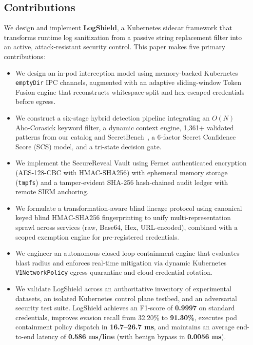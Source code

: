 \documentclass[conference]{IEEEtran}
\begin{document}
\subsection{Contributions}
We design and implement \textbf{LogShield}, a Kubernetes sidecar framework that transforms runtime log sanitization from a passive string replacement filter into an active, attack-resistant security control. This paper makes five primary contributions:
\begin{itemize}
    \item We design an in-pod interception model using memory-backed Kubernetes \texttt{emptyDir} IPC channels, augmented with an adaptive sliding-window Token Fusion engine that reconstructs whitespace-split and hex-escaped credentials before egress.
    \item We construct a six-stage hybrid detection pipeline integrating an $O(N)$ Aho-Corasick keyword filter, a dynamic context engine, 1,361+ validated patterns from our catalog and SecretBench~\cite{basak2023secretbench}, a 6-factor Secret Confidence Score (SCS) model, and a tri-state decision gate.
    \item We implement the SecureReveal Vault using Fernet authenticated encryption (AES-128-CBC with HMAC-SHA256) with ephemeral memory storage (\texttt{tmpfs}) and a tamper-evident SHA-256 hash-chained audit ledger with remote SIEM anchoring.
    \item We formulate a transformation-aware blind lineage protocol using canonical keyed blind HMAC-SHA256 fingerprinting to unify multi-representation sprawl across services (raw, Base64, Hex, URL-encoded), combined with a scoped exemption engine for pre-registered credentials.
    \item We engineer an autonomous closed-loop containment engine that evaluates blast radius and enforces real-time mitigation via dynamic Kubernetes \texttt{V1NetworkPolicy} egress quarantine and cloud credential rotation.
    \item We validate LogShield across an authoritative inventory of experimental datasets, an isolated Kubernetes control plane testbed, and an adversarial security test suite. LogShield achieves an F1-score of \textbf{0.9997} on standard credentials, improves evasion recall from 32.20\% to \textbf{91.30\%}, executes pod containment policy dispatch in \textbf{16.7--26.7 ms}, and maintains an average end-to-end latency of \textbf{0.586 ms/line} (with benign bypass in \textbf{0.0056 ms}).
\end{itemize}
\end{document}
